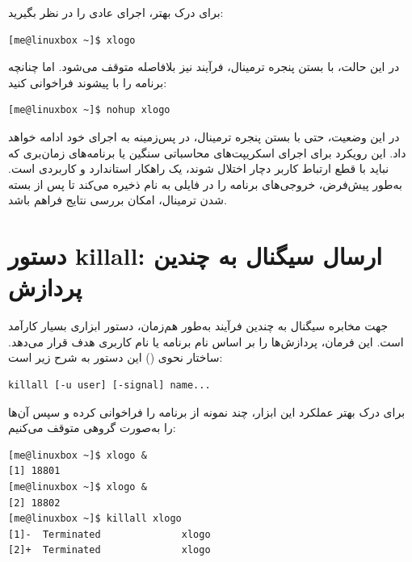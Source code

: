 برای درک بهتر، اجرای عادی  را در نظر بگیرید:

\begin{latin}
\begin{lstlisting}
[me@linuxbox ~]$ xlogo
\end{lstlisting}
\end{latin}

در این حالت، با بستن پنجره ترمینال، فرآیند  نیز بلافاصله متوقف می‌شود. اما چنانچه برنامه را با پیشوند  فراخوانی کنید:

\begin{latin}
\begin{lstlisting}
[me@linuxbox ~]$ nohup xlogo
\end{lstlisting}
\end{latin}

در این وضعیت، حتی با بستن پنجره ترمینال،  در پس‌زمینه به اجرای خود ادامه خواهد داد. این رویکرد برای اجرای اسکریپت‌های محاسباتی سنگین یا برنامه‌های زمان‌بری که نباید با قطع ارتباط کاربر دچار اختلال شوند، یک راهکار استاندارد و کاربردی است. به‌طور پیش‌فرض،  خروجی‌های برنامه را در فایلی به نام  ذخیره می‌کند تا پس از بسته شدن ترمینال، امکان بررسی نتایج فراهم باشد.

\section{دستور killall: ارسال سیگنال به چندین پردازش}

جهت مخابره سیگنال به چندین فرآیند به‌طور هم‌زمان، دستور  ابزاری بسیار کارآمد است. این فرمان، پردازش‌ها را بر اساس نام برنامه یا نام کاربری هدف قرار می‌دهد. ساختار نحوی () این دستور به شرح زیر است:

\begin{latin}
\begin{lstlisting}
killall [-u user] [-signal] name...
\end{lstlisting}
\end{latin}

برای درک بهتر عملکرد این ابزار، چند نمونه از برنامه  را فراخوانی کرده و سپس آن‌ها را به‌صورت گروهی متوقف می‌کنیم:

\begin{latin}
\begin{lstlisting}
[me@linuxbox ~]$ xlogo &
[1] 18801
[me@linuxbox ~]$ xlogo &
[2] 18802
[me@linuxbox ~]$ killall xlogo
[1]-  Terminated              xlogo
[2]+  Terminated              xlogo
\end{lstlisting}
\end{latin}

